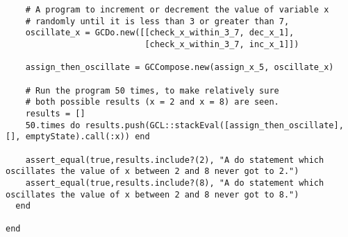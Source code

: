 \documentclass[11pt]{article}
\theoremstyle{definition}
\begin{document}
\begin{verbatim}
    # A program to increment or decrement the value of variable x
    # randomly until it is less than 3 or greater than 7,
    oscillate_x = GCDo.new([[check_x_within_3_7, dec_x_1],
                            [check_x_within_3_7, inc_x_1]])

    assign_then_oscillate = GCCompose.new(assign_x_5, oscillate_x)
    
    # Run the program 50 times, to make relatively sure
    # both possible results (x = 2 and x = 8) are seen.
    results = []
    50.times do results.push(GCL::stackEval([assign_then_oscillate], [], emptyState).call(:x)) end

    assert_equal(true,results.include?(2), "A do statement which oscillates the value of x between 2 and 8 never got to 2.")
    assert_equal(true,results.include?(8), "A do statement which oscillates the value of x between 2 and 8 never got to 8.")
  end

end
\end{verbatim}
\end{document}
